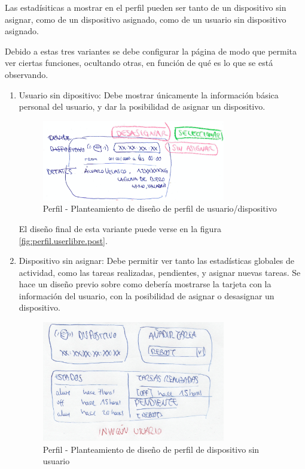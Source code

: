 \begin{enumerate}
    Las estadísiticas a mostrar en el perfil pueden ser tanto de un dispositivo sin asignar, como de un dispositivo asignado, como de un usuario sin dispositivo asignado.
    
    Debido a estas tres variantes se debe configurar la página de modo que permita ver ciertas funciones, ocultando otras, en función de qué es lo que se está observando.
    
    \begin{enumerate}
        
        \item Usuario sin dipositivo:
        Debe mostrar únicamente la información básica personal del usuario, y dar la posibilidad de asignar un dispositivo.
        
        \begin{figure}[H]   
            \centering
            \includegraphics[width=8cm]{./img/web/perfil/stats.user.device.png}
            \caption{Perfil - Planteamiento de diseño de perfil de usuario/dispositivo}
            \label{fig:testfigura}
        \end{figure}
        El diseño final de esta variante puede verse en la figura \ref{fig:perfil.userlibre.post}.
        
        \item Dispositivo sin asignar:
        Debe permitir ver tanto las estadísticas globales de actividad, como las tareas realizadas, pendientes, y asignar nuevas tareas. Se hace un diseño previo sobre como debería mostrarse la tarjeta con la información del usuario, con la posibilidad de asignar o desasignar un dispositivo.
        
        \begin{figure}[H]   
            \centering
            \includegraphics[width=8cm]{./img/web/perfil/stats.1.png}
            \caption{Perfil - Planteamiento de diseño de perfil de dispositivo sin usuario}
            \label{fig:perfil.tareas}
        \end{figure}
        

\end{enumerate}
\end{enumerate}
